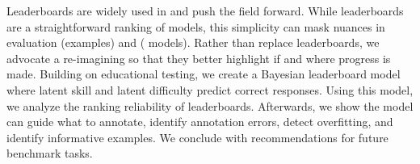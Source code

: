 Leaderboards are widely used in \nlp{} and push the field forward.
While leaderboards are a straightforward ranking of \nlp{} models, this simplicity can mask nuances in evaluation \itms{} (examples) and \subjs{} (\nlp{} models).
Rather than replace leaderboards, we advocate a re-imagining so that they better highlight if and where progress is made.
Building on educational testing, we create a Bayesian leaderboard model where latent \subj{} skill and latent \itm{} difficulty predict correct responses.
Using this model, we analyze the ranking reliability of leaderboards.
Afterwards, we show the model can guide what to annotate, identify annotation errors, detect overfitting, and identify informative examples.
We conclude with recommendations for future benchmark tasks.
